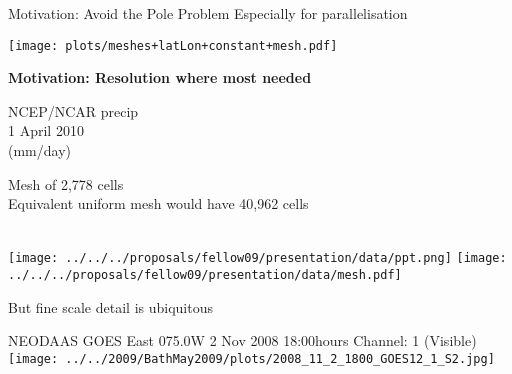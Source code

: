 \begin{slide}
{
    Motivation: Avoid the Pole Problem
    {
        \normalsize\normalfont
        Especially for parallelisation
    }
}

\begin{center}
\texttt{[image: plots/meshes+latLon+constant+mesh.pdf]}
\end{center}

\end{slide}

\begin{slide}{}

\begin{minipage}[t]{0.24\linewidth}\raggedright

{\Large\bf
Motivation: Resolution where most needed
}

\vspace{0.5in}

NCEP/NCAR precip\\
1 April 2010\\
(mm/day)

\vspace{2.5in}

Mesh of 2,778 cells\\
Equivalent uniform mesh would have 40,962 cells\\

\end{minipage}
%
\begin{minipage}[t]{0.75\linewidth}\raggedright\ \\ \vspace{-0.1in}
\texttt{[image: ../../../proposals/fellow09/presentation/data/ppt.png]}
\texttt{[image: ../../../proposals/fellow09/presentation/data/mesh.pdf]}
\end{minipage}


\end{slide}

\begin{slide}{But fine scale detail is ubiquitous}

\begin{center}
NEODAAS GOES East 075.0W 2 Nov 2008 18:00hours Channel: 1 (Visible)
\texttt{[image: ../../2009/BathMay2009/plots/2008\_11\_2\_1800\_GOES12\_1\_S2.jpg]}
\end{center}

\end{slide}

